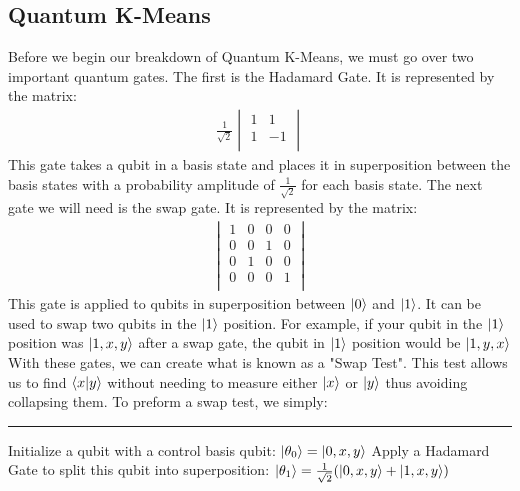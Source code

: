 \documentclass[conference]{IEEEtran}
\begin{document}
\subsection{Quantum K-Means}
Before we begin our breakdown of Quantum K-Means, we must go over two important quantum gates. The first is the Hadamard Gate. It is represented by the matrix:
\begin{align*}
\frac{1}{\sqrt{2}}
    \begin{vmatrix}
    1 & 1 \\
    1 & -1 \\
    \end{vmatrix} 
\end{align*} 
This gate takes a qubit in a basis state and places it in superposition between the basis states with a probability amplitude of $\frac{1}{\sqrt{2}}$ for each basis state. The next gate we will need is the swap gate. It is represented by the matrix: \begin{align*}
    \begin{vmatrix}
    1 & 0 & 0 & 0 \\
    0 & 0 & 1 & 0 \\
    0 & 1 & 0 & 0 \\
    0 & 0 & 0 & 1\\
    \end{vmatrix} 
\end{align*} 
This gate is applied to qubits in superposition between $\ket{0}$ and $\ket{1}$. It can be used to swap two qubits in the $\ket{1}$ position. For example, if your qubit in the $\ket{1}$ position was $\ket{1,x,y}$ after a swap gate, the qubit in $\ket{1}$ position would be $\ket{1,y,x}$ \cite{b5}
\newline
\indent With these gates, we can create what is known as a "Swap Test". This test allows us to find $\bra{x}\ket{y}$ without needing to measure either $\ket{x}$ or $\ket{y}$ thus avoiding collapsing them. To preform a swap test, we simply:
\noindent\rule{\columnwidth}{1pt}
\newline
   Initialize a qubit with a control basis qubit: \newline 
 $ \ket{\theta_0} = \ket{0,x,y} $ \newline \newline
   Apply a Hadamard Gate to split this qubit into superposition: \newline
 $  \ket{\theta_1} = \frac{1}{\sqrt{2}}(\ket{0,x,y}+ \ket{1,x,y})  $ \newline  \newline
\end{document}

